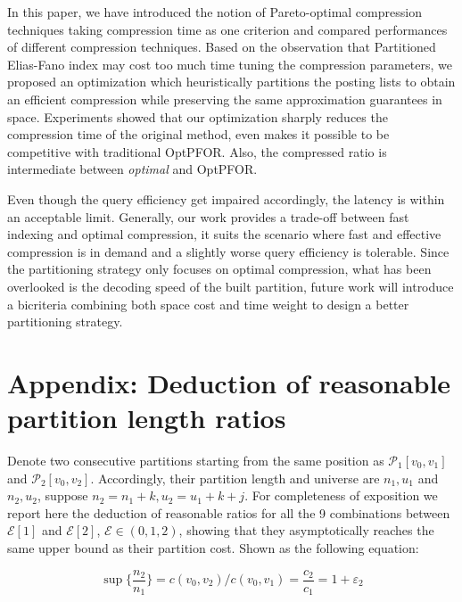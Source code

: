 \documentclass[runningheads,a4paper]{llncs}
\begin{document}
In this paper, we have introduced the notion of Pareto-optimal compression techniques taking compression time as one criterion and compared performances of different compression techniques.
Based on the observation that Partitioned Elias-Fano index may cost too much time tuning the compression parameters, we proposed an optimization which heuristically partitions the posting lists to obtain an efficient compression while preserving the same approximation guarantees in space.
Experiments showed that our optimization sharply reduces the compression time of the original method, even makes it possible to be competitive with traditional OptPFOR.
Also, the compressed ratio is intermediate between \textit{optimal} and OptPFOR.

Even though the query efficiency get impaired accordingly, the latency is within an acceptable limit.
Generally, our work provides a trade-off between fast indexing and optimal compression, it suits the scenario where fast and effective compression is in demand and a slightly worse query efficiency is tolerable.
Since the partitioning strategy only focuses on optimal compression, what has been overlooked is the decoding speed of the built partition, future work will introduce a bicriteria combining both space cost and time weight to design a better partitioning strategy.




\section*{Appendix: Deduction of reasonable partition length ratios}\label{sec:appendix}

Denote two consecutive partitions starting from the same position as $ \mathcal{P}_{1}[ v_0, v_1 ] $ and $ \mathcal{P}_{2}[v_0, v_2] $.
Accordingly, their partition length and universe are $ n_1, u_1 $ and $ n_2, u_2 $, suppose $n_2 = n_1 + k, u_2 = u_1 + k + j $.
For completeness of exposition we report here the deduction of reasonable ratios for all the 9 combinations between $ \mathcal{E}[1] $ and $ \mathcal{E}[2] $, $ \mathcal{E} \in (0, 1, 2) $, showing that they asymptotically reaches the same upper bound as their partition cost.
Shown as the following equation:

\begin{equation}
	\sup\{\frac{n_2}{n_{1}}\} = {c\left(v_{0}, v_{2}\right)}/{c\left(v_{0}, v_{1}\right)}=\frac{c_2}{c_1}=1+\varepsilon_{2}
\end{equation}
\end{document}
